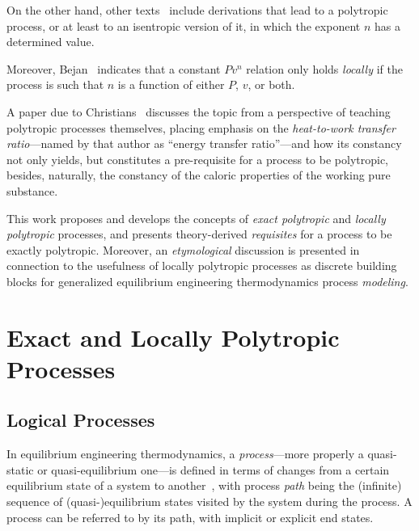 \documentclass[fleqn,11pt]{SelfArx}
\begin{document}
    On  the  other  hand,  other  texts~\cite{1986-JonesJB+HawkinsGA-Wiley,   2006-BejanA-Wiley,
    2015-KroosKA+PotterMC-Cengage} include derivations that lead to a polytropic process, or  at
    least to an isentropic version of it, in which the exponent $n$ has a determined value.

    Moreover, Bejan~\cite[p.~175]{2006-BejanA-Wiley} indicates that a constant  $Pv^n$  relation
    only holds \emph{locally} if the process is such that $n$ is a function of either $P$,  $v$,
    or both.

    A paper due to Christians~\cite{2012-ChristiansJ-IntJMechEngEduc} discusses the topic from a
    perspective  of  teaching  polytropic  processes  themselves,  placing   emphasis   on   the
    \emph{heat-to-work transfer ratio}---named by that author as ``energy transfer ratio''---and
    how its constancy not only yields, but constitutes a  pre-requisite  for  a  process  to  be
    polytropic, besides, naturally, the constancy of the caloric properties of the working  pure
    substance.

    This work proposes and develops the concepts of \emph{exact  polytropic}  and  \emph{locally
    polytropic} processes, and presents theory-derived \emph{requisites} for  a  process  to  be
    exactly polytropic. Moreover, an \emph{etymological} discussion is presented  in  connection
    to  the  usefulness  of  locally  polytropic  processes  as  discrete  building  blocks  for
    generalized equilibrium engineering thermodynamics process \emph{modeling}.

\section{Exact and Locally Polytropic Processes}

    \subsection{Logical Processes}

    In equilibrium engineering thermodynamics, a \emph{process}---more properly  a  quasi-static
    or quasi-equilibrium one---is defined in terms of changes from a certain  equilibrium  state
    of a system to another~\cite{2013-CengelYA+BolesMA-AMGH}, with process \emph{path} being the
    (infinite) sequence of (quasi-)equilibrium states visited by the system during the  process.
    A process can be referred to by its path, with implicit or explicit end states.
\end{document}
